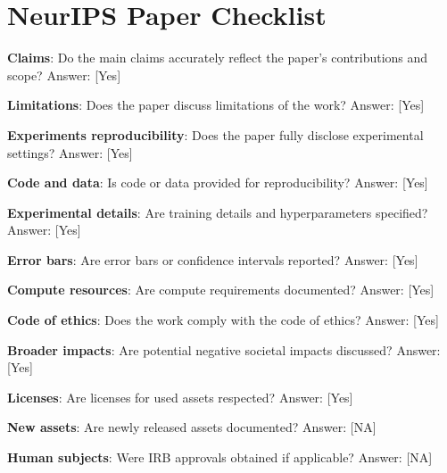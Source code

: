 \documentclass{article}
\begin{document}
\section{NeurIPS Paper Checklist}

\label{sec:neurips_paper_checklist}

\textbf{Claims}: Do the main claims accurately reflect the paper's contributions and scope?
Answer: [Yes]

\textbf{Limitations}: Does the paper discuss limitations of the work?
Answer: [Yes]

\textbf{Experiments reproducibility}: Does the paper fully disclose experimental settings?
Answer: [Yes]

\textbf{Code and data}: Is code or data provided for reproducibility?
Answer: [Yes]

\textbf{Experimental details}: Are training details and hyperparameters specified?
Answer: [Yes]

\textbf{Error bars}: Are error bars or confidence intervals reported?
Answer: [Yes]

\textbf{Compute resources}: Are compute requirements documented?
Answer: [Yes]

\textbf{Code of ethics}: Does the work comply with the code of ethics?
Answer: [Yes]

\textbf{Broader impacts}: Are potential negative societal impacts discussed?
Answer: [Yes]

\textbf{Licenses}: Are licenses for used assets respected?
Answer: [Yes]

\textbf{New assets}: Are newly released assets documented?
Answer: [NA]

\textbf{Human subjects}: Were IRB approvals obtained if applicable?
Answer: [NA]



\end{document}
